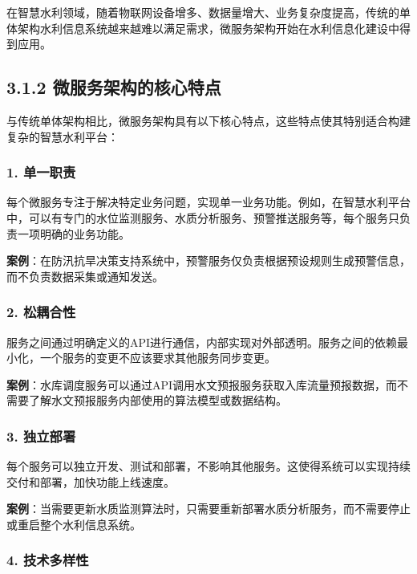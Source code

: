 在智慧水利领域，随着物联网设备增多、数据量增大、业务复杂度提高，传统的单体架构水利信息系统越来越难以满足需求，微服务架构开始在水利信息化建设中得到应用。

\subsection{3.1.2
微服务架构的核心特点}\label{ux5faeux670dux52a1ux67b6ux6784ux7684ux6838ux5fc3ux7279ux70b9}

与传统单体架构相比，微服务架构具有以下核心特点，这些特点使其特别适合构建复杂的智慧水利平台：

\subsubsection{1. 单一职责}\label{ux5355ux4e00ux804cux8d23}

每个微服务专注于解决特定业务问题，实现单一业务功能。例如，在智慧水利平台中，可以有专门的水位监测服务、水质分析服务、预警推送服务等，每个服务只负责一项明确的业务功能。

\textbf{案例}：在防汛抗旱决策支持系统中，预警服务仅负责根据预设规则生成预警信息，而不负责数据采集或通知发送。

\subsubsection{2. 松耦合性}\label{ux677eux8026ux5408ux6027}

服务之间通过明确定义的API进行通信，内部实现对外部透明。服务之间的依赖最小化，一个服务的变更不应该要求其他服务同步变更。

\textbf{案例}：水库调度服务可以通过API调用水文预报服务获取入库流量预报数据，而不需要了解水文预报服务内部使用的算法模型或数据结构。

\subsubsection{3. 独立部署}\label{ux72ecux7acbux90e8ux7f72}

每个服务可以独立开发、测试和部署，不影响其他服务。这使得系统可以实现持续交付和部署，加快功能上线速度。

\textbf{案例}：当需要更新水质监测算法时，只需要重新部署水质分析服务，而不需要停止或重启整个水利信息系统。

\subsubsection{4. 技术多样性}\label{ux6280ux672fux591aux6837ux6027}

